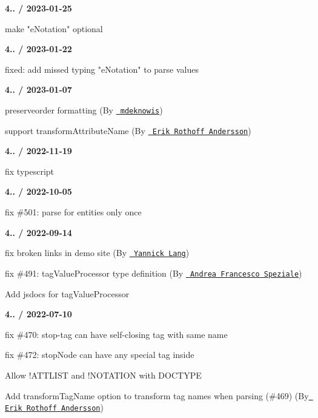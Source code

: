{\bfseries{4.. / 2023-\/01-\/25}}
\begin{DoxyItemize}
\item make "{}e\+Notation"{} optional
\end{DoxyItemize}

{\bfseries{4.. / 2023-\/01-\/22}}
\begin{DoxyItemize}
\item fixed\+: add missed typing "{}e\+Notation"{} to parse values
\end{DoxyItemize}

{\bfseries{4.. / 2023-\/01-\/07}}
\begin{DoxyItemize}
\item preserveorder formatting (By \href{https://github.com/mdeknowis}{\texttt{ mdeknowis}})
\item support {\ttfamily transform\+Attribute\+Name} (By \href{https://github.com/erkie}{\texttt{ Erik Rothoff Andersson}})
\end{DoxyItemize}

{\bfseries{4.. / 2022-\/11-\/19}}
\begin{DoxyItemize}
\item fix typescript
\end{DoxyItemize}

{\bfseries{4.. / 2022-\/10-\/05}}
\begin{DoxyItemize}
\item fix \#501\+: parse for entities only once
\end{DoxyItemize}

{\bfseries{4.. / 2022-\/09-\/14}}
\begin{DoxyItemize}
\item fix broken links in demo site (By \href{https://github.com/layaxx}{\texttt{ Yannick Lang}})
\item fix \#491\+: tag\+Value\+Processor type definition (By \href{https://github.com/andreafspeziale}{\texttt{ Andrea Francesco Speziale}})
\item Add jsdocs for tag\+Value\+Processor
\end{DoxyItemize}

{\bfseries{4.. / 2022-\/07-\/10}}
\begin{DoxyItemize}
\item fix \#470\+: stop-\/tag can have self-\/closing tag with same name
\item fix \#472\+: stop\+Node can have any special tag inside
\item Allow !\+ATTLIST and !\+NOTATION with DOCTYPE
\item Add transform\+Tag\+Name option to transform tag names when parsing (\#469) (By \href{https://github.com/erkie}{\texttt{ Erik Rothoff Andersson}})
\end{DoxyItemize}

